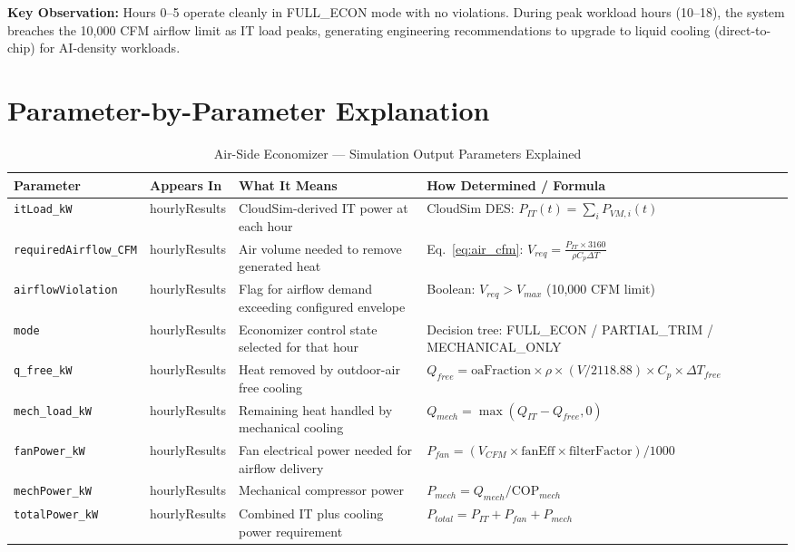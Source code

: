 \documentclass[12pt,a4paper]{report}
\begin{document}
\noindent\textbf{Key Observation:} Hours 0--5 operate cleanly in FULL\_ECON mode with no violations.
During peak workload hours (10--18), the system breaches the 10{,}000 CFM airflow limit as IT load peaks,
generating engineering recommendations to upgrade to liquid cooling (direct-to-chip) for AI-density workloads.

\section{Parameter-by-Parameter Explanation}

\begin{table}[H]
\centering
\caption{Air-Side Economizer --- Simulation Output Parameters Explained}
\label{tab:air_params}
\renewcommand{\arraystretch}{1.3}
\scriptsize
\begin{tabular}{p{3cm}p{2.5cm}p{4.5cm}p{4.5cm}}
\toprule
\textbf{Parameter} & \textbf{Appears In} & \textbf{What It Means} & \textbf{How Determined / Formula} \\
\midrule
\texttt{itLoad\_kW} & hourlyResults & CloudSim-derived IT power at each hour & CloudSim DES: $P_{IT}(t) = \sum_{i} P_{VM,i}(t)$ \\
\texttt{requiredAirflow\_CFM} & hourlyResults & Air volume needed to remove generated heat & Eq.~\ref{eq:air_cfm}: $V_{req} = \frac{P_{IT} \times 3160}{\rho C_p \Delta T}$ \\
\texttt{airflowViolation} & hourlyResults & Flag for airflow demand exceeding configured envelope & Boolean: $V_{req} > V_{max}$ (10{,}000 CFM limit) \\
\texttt{mode} & hourlyResults & Economizer control state selected for that hour & Decision tree: FULL\_ECON / PARTIAL\_TRIM / MECHANICAL\_ONLY \\
\texttt{q\_free\_kW} & hourlyResults & Heat removed by outdoor-air free cooling & $Q_{free} = \text{oaFraction} \times \rho \times (V/2118.88) \times C_p \times \Delta T_{free}$ \\
\texttt{mech\_load\_kW} & hourlyResults & Remaining heat handled by mechanical cooling & $Q_{mech} = \max(Q_{IT} - Q_{free}, 0)$ \\
\texttt{fanPower\_kW} & hourlyResults & Fan electrical power needed for airflow delivery & $P_{fan} = (V_{CFM} \times \text{fanEff} \times \text{filterFactor}) / 1000$ \\
\texttt{mechPower\_kW} & hourlyResults & Mechanical compressor power & $P_{mech} = Q_{mech} / \text{COP}_{mech}$ \\
\texttt{totalPower\_kW} & hourlyResults & Combined IT plus cooling power requirement & $P_{total} = P_{IT} + P_{fan} + P_{mech}$ \\

\end{tabular}
\end{table}
\end{document}
